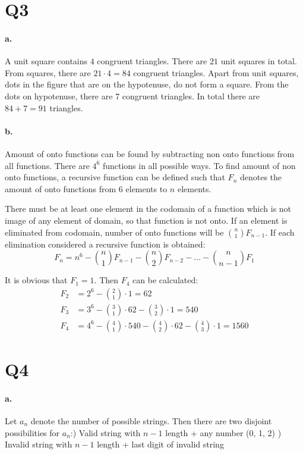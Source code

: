 \documentclass[11pt]{article}
\begin{document}
\section*{Q3}
\paragraph{\textbf{a.}}
A unit square contains $4$ congruent triangles. There are $21$ unit squares in total. From squares, there are $21 \cdot 4 = 84$ congruent triangles.
Apart from unit squares, dots in the figure that are on the hypotenuse, do not form a square. From the dots on hypotenuse, there are $7$ congruent triangles.
In total there are $84 + 7 = 91$ triangles.
\paragraph{\textbf{b.}}
Amount of onto functions can be found by subtracting non onto functions from all functions. There are $4^6$ functions in all possible ways. To find amount of non onto functions, a recursive function can be defined such that $F_n$ denotes the amount of onto functions from $6$ elements to $n$ elements.

There must be at least one element in the codomain of a function which is not image of any element of domain, so that function is not onto. If an element is eliminated from codomain, number of onto functions will be ${n \choose 1} F_{n-1}$. If each elimination considered a recursive function is obtained:
\begin{equation*}
	F_n = n^6 - {n \choose 1}F_{n-1} - {n \choose 2}F_{n-2} - \dots - {n \choose n-1}F_1
\end{equation*}

It is obvious that $F_1=1$. Then $F_4$ can be calculated:
\begin{align*}
	F_2 &= 2^6 - {2 \choose 1}\cdot 1 = 62 \\
	F_3 &= 3^6 - {3 \choose 1}\cdot 62 - {3 \choose 2}\cdot 1 = 540 \\
	F_4 &= 4^6 - {4 \choose 1}\cdot 540 - {4 \choose 2}\cdot 62 - {4 \choose 3}\cdot 1 = 1560
\end{align*}

\section*{Q4}
\paragraph{\textbf{a.}}
Let $a_n$ denote the number of possible strings. Then there are two disjoint possibilities for $a_{n}$:) Valid string with $n-1$ length + any number (0, 1, 2) ) Invalid string with $n-1$ length + last digit of invalid string
\end{document}
